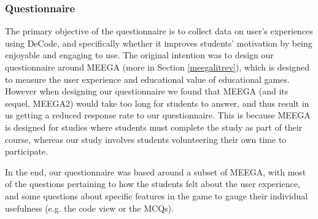 \documentclass[11pt]{article}
\begin{document}
\subsubsection{Questionnaire}
The primary objective of the questionnaire is to collect data on user's experiences using DeCode, and specifically whether it improves students' motivation by being enjoyable and engaging to use. The original intention was to design our questionnaire around MEEGA\cite{Rafael}\cite{meegaPlus} (more in Section \ref{meegalitrev}), which is designed to measure the user experience and educational value of educational games. However when designing our questionnaire we found that MEEGA (and its sequel, MEEGA2) would take too long for students to answer, and thus result in us getting a reduced response rate to our questionnaire. This is because MEEGA is designed for studies where students must complete the study as part of their course, whereas our study involves students volunteering their own time to participate.\par
In the end, our questionnaire was based around a subset of MEEGA, with most of the questions pertaining to how the students felt about the user experience, and some questions about specific features in the game to gauge their individual usefulness (e.g. the code view or the MCQs).
\end{document}
